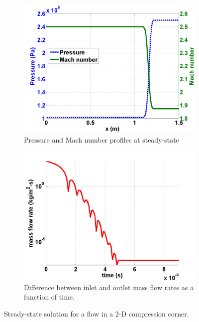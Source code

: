 \documentclass[preprint,10pt]{elsarticle}
\begin{document}
\begin{figure}[H]
        \begin{subfigure}[b]{0.49\textwidth}
                \centering
                \includegraphics[width=\textwidth]{mach_number_pressure.png}
                \caption{Pressure and Mach number profiles at steady-state}
                \label{fig:2d_corner_isomach}
        \end{subfigure}        
        \begin{subfigure}[b]{0.49\textwidth}
                \centering
                \includegraphics[width=\textwidth]{CompressionCorner2DQ.png}
                \caption{Difference between inlet and outlet mass flow rates as a function of time.}
                \label{fig:2d_convergence}
        \end{subfigure}
        \caption{Steady-state solution for a flow in a $2$-D compression corner.}\label{fig:2d_corner}
\end{figure}
\end{document}
